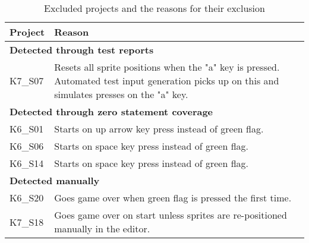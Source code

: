 \begin{table}[htpb]
    \centering
    \scriptsize
    \begin{tabular}{lp{10.5cm}}
        \toprule
        Project & Reason                                                                           \\
        \midrule
        \multicolumn{2}{l}{\textbf{Detected through test reports}}                                 \\
        K7\_S07 & Resets all sprite positions when the "a" key is pressed.
                  Automated test input generation picks up on this and
                  simulates presses on the "a" key.                                                \\[1.4\bigskipamount]

        \multicolumn{2}{l}{\textbf{Detected through zero statement coverage}}                      \\
        K6\_S01 & Starts on up arrow key press instead of green flag.                              \\
        K6\_S06 & Starts on space key press instead of green flag.                                 \\
        K6\_S14 & Starts on space key press instead of green flag.                                 \\[\medskipamount]

        \multicolumn{2}{l}{\textbf{Detected manually}}                                             \\
        K6\_S20 & Goes game over when green flag is pressed the first time.                        \\
        K7\_S18 & Goes game over on start unless sprites are re-positioned manually in the editor. \\
        \bottomrule
    \end{tabular}
    \caption{Excluded projects and the reasons for their exclusion}
    \label{tab:excluded_projects}
\end{table}

